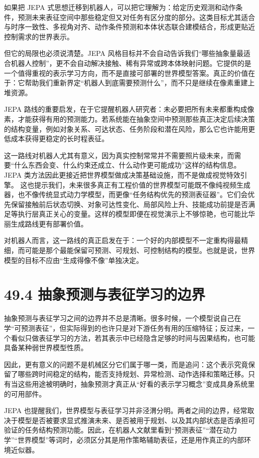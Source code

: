 如果把 JEPA 式思想迁移到机器人，可以把它理解为：给定历史观测和动作条件，预测未来表征空间中那些稳定但又对任务有区分度的部分。这类目标尤其适合与时序一致性、多视角对齐、动作条件预测和本体状态联合建模结合，形成更贴近控制需求的世界表示。

但它的局限也必须说清楚。JEPA 风格目标并不会自动告诉我们“哪些抽象量最适合机器人控制”，更不会自动解决接触、稀有异常或跨本体映射问题。它提供的是一个值得重视的表示学习方向，而不是直接可部署的世界模型答案。真正的价值在于：它帮助我们重新界定“机器人到底需要预测什么”，而不只是继续在像素重建上堆资源。

JEPA 路线的重要启发，在于它提醒机器人研究者：未必要把所有未来都重构成像素，才能获得有用的预测能力。若系统能在抽象空间中预测那些真正决定后续决策的结构变量，例如对象关系、可达状态、任务阶段和潜在风险，那么它也许能用更低成本获得更稳定的长时程表征。

这一路线对机器人尤其有意义，因为真实控制常常并不需要照片级未来，而需要“什么东西会变、什么约束还成立、什么动作更可能成功”这样的结构信息。JEPA 类方法因此更接近把世界模型做成决策基础设施，而不是做成视觉特效引擎。 这也提示我们，未来很多真正有工程价值的世界模型可能既不像纯视频生成器，也不像传统显式动力学模型，而更像“任务结构优先的预测表征器”。它们会优先保留接触前后状态切换、对象可达性变化、局部风险上升、技能成功前提是否满足等执行层真正关心的变量。这样的模型即便在视觉演示上不够惊艳，也可能比华丽生成路线更有部署价值。

对机器人而言，这一路线的真正启发在于：一个好的内部模型不一定重构得最精细，而可能是那个最能保留可预测、可规划、可控制结构的模型。也就是说，世界模型的目标不应由“生成得像不像”单独决定。

\section*{49.4 抽象预测与表征学习的边界}


抽象预测与表征学习之间的边界并不总是清晰。很多时候，一个模型说自己在学“可预测表征”，但实际得到的也许只是对下游任务有用的压缩特征；反过来，一个看似只做表征学习的方法，若其表示中已经隐含足够的时间与因果结构，也可能具备某种弱世界模型性质。

因此，更有意义的问题不是机械区分它们属于哪一类，而是追问：这个表示究竟保留了哪些跨时间稳定的结构，能否支持规划、异常检测、动作选择和策略迁移。只有当这些用途被明确时，抽象预测才真正从“好看的表示学习概念”变成具身系统里的可用部件。

JEPA 也提醒我们，世界模型与表征学习并非泾渭分明。两者之间的边界，经常取决于模型是否被要求显式推演未来、是否被用于规划、以及其内部状态是否承担可验证的任务结构预测功能。因此，在机器人文献里看到“预测表征”“潜在动力学”“世界模型”等词时，必须区分其是用作策略辅助表征，还是用作真正的内部环境近似器。


